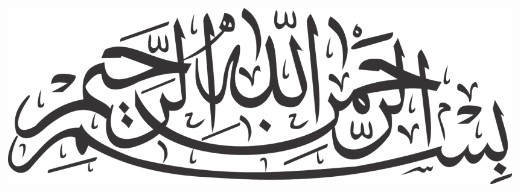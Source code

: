 

\begin{center}
\vspace*{\fill}
\includegraphics[width=1\textwidth]{Images/toppng.com-bismillah-png-images-free-download-bismillah-calligraphy-1600x559.png}
\vspace*{\fill}
\end{center}